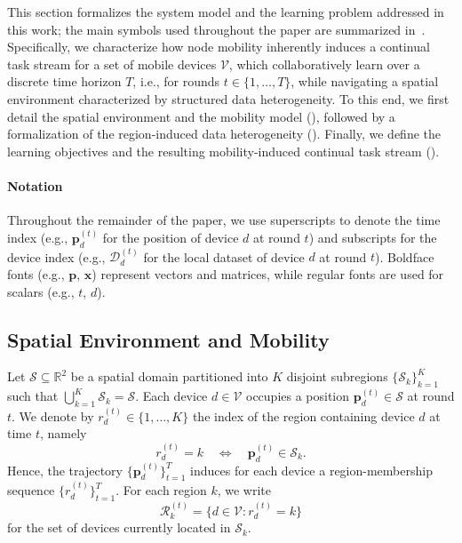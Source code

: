 \documentclass[conference]{IEEEtran}
\theoremstyle{plain}
\theoremstyle{definition}
\begin{document}
This section formalizes the system model and the learning problem addressed in this work;
 the main symbols used throughout the paper are summarized in~.
Specifically, we characterize how node mobility inherently induces a continual task stream for a set of mobile devices $\mathcal{V}$, 
which collaboratively learn over a discrete time horizon $T$, i.e., for rounds $t \in \{1,\dots,T\}$,
while navigating a spatial environment characterized by structured data heterogeneity.
To this end, we first detail the spatial environment and the mobility model (), 
followed by a formalization of the region-induced data heterogeneity (). 
Finally, we define the learning objectives and the resulting mobility-induced continual task stream ().

\paragraph*{Notation}
Throughout the remainder of the paper, 
we use superscripts to denote the time index (e.g., $\mathbf{p}_d^{(t)}$ for the position of device $d$ at round $t$) 
and subscripts for the device index (e.g., $\mathcal{D}_d^{(t)}$ for the local dataset of device $d$ at round $t$). 
Boldface fonts (e.g., $\mathbf{p}$, $\mathbf{x}$) represent vectors and matrices, 
while regular fonts are used for scalars (e.g., $t$, $d$).

\subsection{Spatial Environment and Mobility}\label{sec:formalization-mobility}
Let $\mathcal{S} \subseteq \mathbb{R}^2$ be a spatial domain partitioned into $K$ disjoint subregions
 $\{\mathcal{S}_k\}_{k=1}^K$ such that $\bigcup_{k=1}^K \mathcal{S}_k = \mathcal{S}$.
Each device $d \in \mathcal{V}$ occupies a position $\mathbf{p}_d^{(t)} \in \mathcal{S}$ at round $t$.
We denote by $r_d^{(t)} \in \{1, \dots, K\}$ the index of the region containing device $d$ at time $t$, namely
\[
    r_d^{(t)} = k \quad \Longleftrightarrow \quad \mathbf{p}_d^{(t)} \in \mathcal{S}_k.
\]
Hence, the trajectory $\{\mathbf{p}_d^{(t)}\}_{t=1}^T$ induces for each device a region-membership sequence $\{r_d^{(t)}\}_{t=1}^T$.
For each region $k$, we write
\[
    \mathcal{R}_k^{(t)} = \{d \in \mathcal{V} : r_d^{(t)} = k\}
\]
for the set of devices currently located in $\mathcal{S}_k$.
\end{document}
